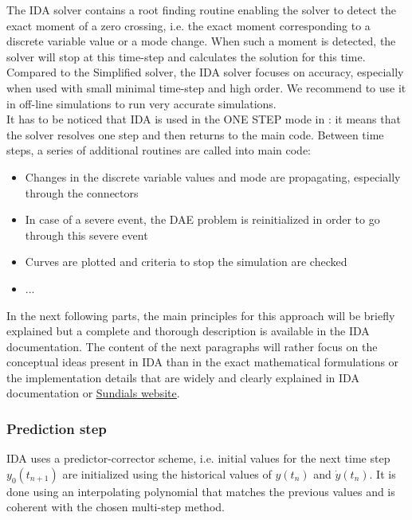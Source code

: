 \documentclass[a4paper, 12pt]{report}
\begin{document}
The \ac{IDA} solver contains a root finding routine enabling the solver to detect the exact moment of a zero crossing, i.e. the exact moment corresponding to a discrete variable value or a mode change. When such a moment is detected, the solver will stop at this time-step and calculates the solution for this time. Compared to the Simplified solver, the \ac{IDA} solver focuses on accuracy, especially when used with small minimal time-step and high order.
We recommend to use it in off-line simulations to run very accurate simulations. \\

It has to be noticed that \ac{IDA} is used in the ONE STEP mode in \Dynawo : it means that the solver resolves one step and then returns to the main \Dynawo code. Between time steps, a series of additional routines are called into \Dynawo main code:
\begin{itemize}
\item Changes in the discrete variable values and mode are propagating, especially through the connectors
\item In case of a severe event, the \ac{DAE} problem is reinitialized in order to go through this severe event
\item Curves are plotted and criteria to stop the simulation are checked
\item ...
\end{itemize}

In the next following parts, the main principles for this approach will be briefly explained but a complete and thorough description is available in the \ac{IDA} documentation. The content of the next paragraphs will rather focus on the conceptual ideas present in \ac{IDA} than in the exact mathematical formulations or the implementation details that are widely and clearly explained in \ac{IDA} documentation or  \href{https://computation.llnl.gov/projects/sundials}{\underline{Sundials website}}.

\subsubsection{Prediction step}

\ac{IDA} uses a predictor-corrector scheme, i.e. initial values for the next time step $y_0(t_{n+1})$ are initialized using the historical values of $y(t_n)$ and $\dot{y}(t_n)$. It is done using an interpolating polynomial that matches the previous values and is coherent with the chosen multi-step method. \\
\end{document}
